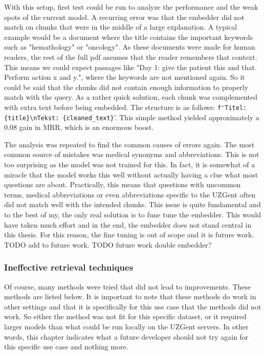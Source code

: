 With this setup, first test could be run to analyze the performance and the weak spots of the current model. A recurring error was that the embedder did not match on chunks that were in the middle of a large explanation. A typical example would be a document where the title contains the important keywords such as "hemathology" or "oncology". As these documents were made for human readers, the rest of the full pdf assumes that the reader remembers that context. This means we could expect passages like "Day 1: give the patient this and that. Perform action x and y.", where the keywords are not mentioned again. So it could be said that the chunks did not contain enough information to properly match with the query. As a rather quick solution, each chunk was complemented with extra text before being embedded. The structure is as follows: \verb|f'Titel: {title}\nTekst: {cleaned_text}|'. This simple method yielded approximately a 0.08 gain in MRR, which is an enormous boost.

The analysis was repeated to find the common causes of errors again. The most common source of mistakes was medical synonyms and abbreviations. This is not too surprising as the model was not trained for this. In fact, it is somewhat of a miracle that the model works this well without actually having a clue what most questions are about. Practically, this means that questions with uncommon terms, medical abbreviations or even abbreviations specific to the UZGent often did not match well with the intended chunks. This issue is quite fundamental and to the best of my, the only real solution is to fune tune the embedder. This would have taken much effort and in the end, the embedder does not stand central in this thesis. For this reason, the fine tuning is out of scope and it is future work. TODO add to future work. TODO future work double embedder?

\subsubsection{Ineffective retrieval techniques}
Of course, many methods were tried that did not lead to improvements. These methods are listed below. It is important to note that these methods do work in other settings and that it is specifically for this use case that the methods did not work. So either the method was not fit for this specific dataset, or it required larger models than what could be run locally on the UZGent servers. In other words, this chapter indicates what a future developer should not try again for this specific use case and nothing more.

